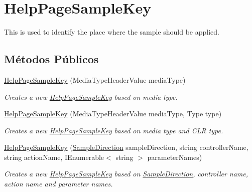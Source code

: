 \hypertarget{classApi3Layers_1_1Areas_1_1HelpPage_1_1HelpPageSampleKey}{}\section{Help\+Page\+Sample\+Key}
\label{classApi3Layers_1_1Areas_1_1HelpPage_1_1HelpPageSampleKey}


This is used to identify the place where the sample should be applied.  


\subsection*{Métodos Públicos}
\begin{DoxyCompactItemize}
\item 
\hyperlink{classApi3Layers_1_1Areas_1_1HelpPage_1_1HelpPageSampleKey_a0d8ff7260ad2ace3e71ca65e99c6ac9c}{Help\+Page\+Sample\+Key} (Media\+Type\+Header\+Value media\+Type)
\begin{DoxyCompactList}\small\item\em Creates a new \hyperlink{classApi3Layers_1_1Areas_1_1HelpPage_1_1HelpPageSampleKey}{Help\+Page\+Sample\+Key} based on media type. \end{DoxyCompactList}\item 
\hyperlink{classApi3Layers_1_1Areas_1_1HelpPage_1_1HelpPageSampleKey_a2f8337defe10f1d20851ef5a9cfb943b}{Help\+Page\+Sample\+Key} (Media\+Type\+Header\+Value media\+Type, Type type)
\begin{DoxyCompactList}\small\item\em Creates a new \hyperlink{classApi3Layers_1_1Areas_1_1HelpPage_1_1HelpPageSampleKey}{Help\+Page\+Sample\+Key} based on media type and C\+LR type. \end{DoxyCompactList}\item 
\hyperlink{classApi3Layers_1_1Areas_1_1HelpPage_1_1HelpPageSampleKey_a9d13ae49a586ec810778b5a497bfbf53}{Help\+Page\+Sample\+Key} (\hyperlink{namespaceApi3Layers_1_1Areas_1_1HelpPage_abad9f6d2b059d72558bf70415efc32b5}{Sample\+Direction} sample\+Direction, string controller\+Name, string action\+Name, I\+Enumerable$<$ string $>$ parameter\+Names)
\begin{DoxyCompactList}\small\item\em Creates a new \hyperlink{classApi3Layers_1_1Areas_1_1HelpPage_1_1HelpPageSampleKey}{Help\+Page\+Sample\+Key} based on \hyperlink{classApi3Layers_1_1Areas_1_1HelpPage_1_1HelpPageSampleKey_a7f001c7cd8d8d35bc4613b02ca9d639c}{Sample\+Direction}, controller name, action name and parameter names. \end{DoxyCompactList}\item 

\end{DoxyCompactItemize}
